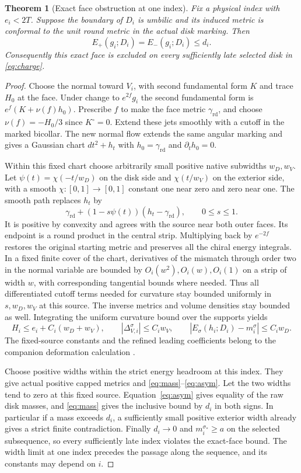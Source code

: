 \documentclass[11pt,letterpaper]{article}
\numberwithin{equation}{section}
\newtheorem{theorem}{Theorem}[section]
\theoremstyle{remark}
\newcommand{\rd}{\gamma_{\mathrm{rd}}}
\begin{document}
\begin{theorem}[Exact face obstruction at one index]\label{thm:exact}
Fix a physical index with \(e_i<2T\).
Suppose the boundary of \(D_i\) is umbilic and its induced
metric is conformal to the unit round metric in the actual
disk marking. Then
\[
 E_+(g_i;D_i)=E_-(g_i;D_i)\le d_i .
\]
Consequently this exact face is excluded on every
sufficiently late selected disk in \eqref{eq:charge}.
\end{theorem}
\begin{proof}
Choose the normal toward \(V_i\), with second fundamental
form \(K\) and trace \(H_0\) at the face. Under change
to \(e^{2f}g_i\) the second fundamental form is
\(e^f(K+\nu(f)h_0)\). Prescribe \(f\) to make the face
metric \(\rd\), and choose \(\nu(f)=-H_0/3\) since
\(K^\circ=0\). Extend these jets smoothly with a
cutoff in the marked bicollar. The new normal flow
extends the same angular marking and gives a Gaussian
chart \(dt^2+h_t\) with \(h_0=\rd\) and
\(\partial_t h_0=0\).

Within this fixed chart choose arbitrarily small
positive native subwidths \(w_D,w_V\). Let
\(\psi(t)=\chi(-t/w_D)\) on the disk side and
\(\chi(t/w_V)\) on the exterior side, with a smooth
\(\chi:[0,1]\to[0,1]\) constant one near zero and zero near one.
The smooth path replaces \(h_t\) by
\[
 \rd+(1-s\psi(t))(h_t-\rd),\qquad 0\le s\le1 .
\]
It is positive by convexity and agrees with the
source near both outer faces. Its endpoint is a
round product in the central strip. Multiplying
back by \(e^{-2f}\) restores the original starting
metric and preserves all the chiral energy integrals.
In a fixed finite cover of the chart, derivatives of
the mismatch through order two in the normal variable
are bounded by \(O_i(w^2),O_i(w),O_i(1)\) on a strip
of width \(w\), with corresponding tangential bounds
where needed. Thus all differentiated cutoff terms
needed for curvature stay bounded uniformly in
\(s,w_D,w_V\) at this source. The inverse metrics and
volume densities stay bounded as well. Integrating
the uniform curvature bound over the supports yields
\[
 H_i\le e_i+C_i(w_D+w_V),\qquad
 |\Delta_{V,i}^\sigma|\le C_i w_V,\qquad
 |E_\sigma(h_i;D_i)-m_i^\sigma|\le C_i w_D .
\]
The fixed-source constants and the refined leading
coefficients belong to the companion deformation
calculation \cite{Baker2026CollarDeformation}.

Choose positive widths within the strict energy
headroom at this index. They give actual positive
capped metrics and \eqref{eq:mass}--\eqref{eq:asym}.
Let the two widths tend to zero at this fixed
source. Equation~\eqref{eq:asym} gives equality of
the raw disk masses, and \eqref{eq:mass} gives the
inclusive bound by \(d_i\) in both signs. In
particular if a mass exceeds \(d_i\), a sufficiently
small positive exterior width already gives a
strict finite contradiction. Finally \(d_i\to0\)
and \(m_i^{\sigma_*}\ge a\) on the selected
subsequence, so every sufficiently late index
violates the exact-face bound. The width limit
at one index precedes the passage along the
sequence, and its constants may depend on \(i\).
\end{proof}
\end{document}
